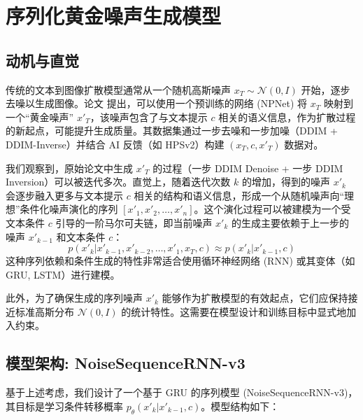 \documentclass{article}
\begin{document}
\section{序列化黄金噪声生成模型}

\subsection{动机与直觉}
传统的文本到图像扩散模型通常从一个随机高斯噪声 $x_T \sim \mathcal{N}(0, I)$ 开始，逐步去噪以生成图像。论文 \cite{zhou2024golden} 提出，可以使用一个预训练的网络 (NPNet) 将 $x_T$ 映射到一个“黄金噪声” $x'_T$，该噪声包含了与文本提示 $c$ 相关的语义信息，作为扩散过程的新起点，可能提升生成质量。其数据集通过一步去噪和一步加噪（DDIM + DDIM-Inverse）并结合 AI 反馈（如 HPSv2）构建 $(x_T, c, x'_T)$ 数据对。

我们观察到，原始论文中生成 $x'_T$ 的过程（一步 DDIM Denoise + 一步 DDIM Inversion）可以被迭代多次。直觉上，随着迭代次数 $k$ 的增加，得到的噪声 $x'_k$ 会逐步融入更多与文本提示 $c$ 相关的结构和语义信息，形成一个从随机噪声向“理想”条件化噪声演化的序列 $[x'_1, x'_2, \dots, x'_n]$。这个演化过程可以被建模为一个受文本条件 $c$ 引导的一阶马尔可夫链，即当前噪声 $x'_k$ 的生成主要依赖于上一步的噪声 $x'_{k-1}$ 和文本条件 $c$：
\begin{equation}
    p(x'_k | x'_{k-1}, x'_{k-2}, \dots, x'_1, x_T, c) \approx p(x'_k | x'_{k-1}, c)
\end{equation}
这种序列依赖和条件生成的特性非常适合使用循环神经网络 (RNN) 或其变体（如 GRU, LSTM）进行建模。

此外，为了确保生成的序列噪声 $x'_k$ 能够作为扩散模型的有效起点，它们应保持接近标准高斯分布 $\mathcal{N}(0, I)$ 的统计特性。这需要在模型设计和训练目标中显式地加入约束。

\subsection{模型架构: NoiseSequenceRNN-v3}
基于上述考虑，我们设计了一个基于 GRU 的序列模型 (NoiseSequenceRNN-v3)，其目标是学习条件转移概率 $p_\theta(x'_k | x'_{k-1}, c)$。模型结构如下：
\end{document}
